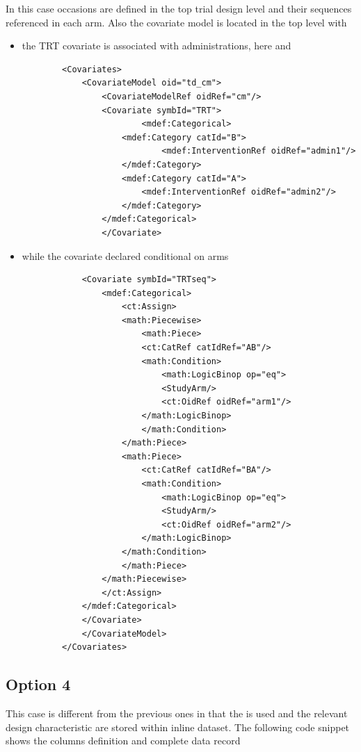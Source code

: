 In this case occasions are defined in the top trial design level and
their sequences referenced in each arm. Also the covariate model 
is located in the top level with
\begin{itemize}
\item 
the TRT covariate is associated with administrations, here 
and 
\lstset{language=XML}
\begin{lstlisting}
		<Covariates>
		    <CovariateModel oid="td_cm">
		        <CovariateModelRef oidRef="cm"/>
		        <Covariate symbId="TRT">
	                    <mdef:Categorical>
			        <mdef:Category catId="B">
		                    <mdef:InterventionRef oidRef="admin1"/>
			        </mdef:Category>
			        <mdef:Category catId="A">
			            <mdef:InterventionRef oidRef="admin2"/>
			        </mdef:Category>
			    </mdef:Categorical>
		        </Covariate>
\end{lstlisting}
\item
while the  covariate declared conditional on arms
\lstset{language=XML}
\begin{lstlisting}
			<Covariate symbId="TRTseq">
			    <mdef:Categorical>
			        <ct:Assign>
				    <math:Piecewise>
				        <math:Piece>
					    <ct:CatRef catIdRef="AB"/>
					    <math:Condition>
					        <math:LogicBinop op="eq">
						    <StudyArm/>
						    <ct:OidRef oidRef="arm1"/>
						</math:LogicBinop>
					    </math:Condition>
					</math:Piece>
					<math:Piece>
					    <ct:CatRef catIdRef="BA"/>
					    <math:Condition>
					        <math:LogicBinop op="eq">
						    <StudyArm/>
						    <ct:OidRef oidRef="arm2"/>
						</math:LogicBinop>
					</math:Condition>
				    </math:Piece>
				</math:Piecewise>
			    </ct:Assign>
			</mdef:Categorical>
		    </Covariate>
	        </CovariateModel>
	    </Covariates>
\end{lstlisting}
\end{itemize}

\subsection{Option 4}

This case  is different from the previous ones in that the 
is used and the relevant design characteristic are stored within inline 
dataset. The following code snippet shows the columns definition and complete 
data record

